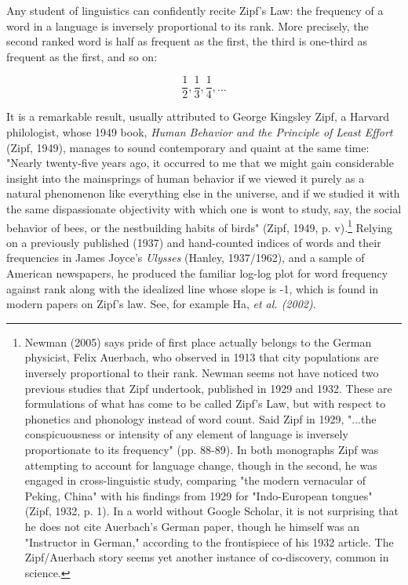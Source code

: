 \documentclass[12pt]{article}
\begin{document}
Any student of linguistics can confidently recite Zipf's Law: the frequency of a word in a language is inversely proportional to its rank.  More precisely, the second ranked word is half as frequent as the first, the third is one-third as frequent as the first, and so on:
\begin{center}
\[\frac{1}{2}, \frac{1}{3}, \frac{1}{4},...\]
\end{center}

It is a remarkable result, usually attributed to George Kingsley Zipf, a Harvard philologist, whose 1949 book, \emph {Human Behavior and the Principle of Least Effort} (Zipf, 1949), manages to sound contemporary and quaint at the same time: "Nearly twenty-five years ago, it occurred to me that we might gain considerable insight into the mainsprings of human behavior if we viewed it purely as a natural phenomenon like everything else in the universe, and if we studied it with the same dispassionate objectivity with which one is wont to study, say, the social behavior of bees, or the nestbuilding habits of birds" (Zipf, 1949, p. v).\footnote[1]{Newman (2005) says pride of first place actually belongs to the German physicist, Felix Auerbach, who observed in 1913 that city populations are inversely proportional to their rank.  Newman seems not have noticed two previous studies that Zipf undertook, published in 1929 and 1932.  These are formulations of what has come to be called Zipf's Law, but with respect to phonetics and phonology instead of word count.  Said Zipf in 1929, "...the conspicuousness or intensity of any element of language is inversely proportionate to its frequency" (pp. 88-89).  In both monographs Zipf was attempting to account for language change, though in the second, he was engaged in cross-linguistic study, comparing "the modern vernacular of Peking, China" with his findings from 1929 for "Indo-European tongues" (Zipf, 1932, p. 1). In a world without Google Scholar, it is not surprising that he does not cite Auerbach's German paper, though he himself was an "Instructor in German," according to the frontispiece of his 1932 article. The Zipf/Auerbach story seems yet another instance of co-discovery, common in science.}  Relying on a previously published (1937) and hand-counted indices of words and their frequencies in James Joyce's \emph{Ulysses} (Hanley, 1937/1962), and a sample of American newspapers, he produced the familiar log-log plot for word frequency against rank along with the idealized line whose slope is -1, which is found in modern papers on Zipf's law.  See, for example Ha, \emph{et al. (2002)}. \\
\end{document}
